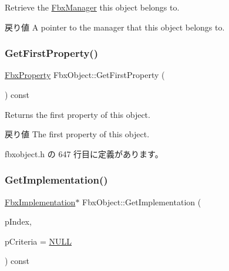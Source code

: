 Retrieve the \hyperlink{class_fbx_manager}{Fbx\+Manager} this object belongs to. \begin{DoxyReturn}{戻り値}
A pointer to the manager that this object belongs to. 
\end{DoxyReturn}
\mbox{\label{class_fbx_object_abc7d6efa0f0b7f0037818b8700465077}} 
\subsubsection{\texorpdfstring{Get\+First\+Property()}{GetFirstProperty()}}
{\footnotesize\ttfamily \hyperlink{class_fbx_property}{Fbx\+Property} Fbx\+Object\+::\+Get\+First\+Property (\begin{DoxyParamCaption}{ }\end{DoxyParamCaption}) const\hspace{0.3cm}{\ttfamily [inline]}}

Returns the first property of this object. \begin{DoxyReturn}{戻り値}
The first property of this object. 
\end{DoxyReturn}


 fbxobject.\+h の 647 行目に定義があります。

\mbox{\label{class_fbx_object_a396d7a8496c2eef786ce73bac59ab55a}} 
\subsubsection{\texorpdfstring{Get\+Implementation()}{GetImplementation()}}
{\footnotesize\ttfamily \hyperlink{class_fbx_implementation}{Fbx\+Implementation}$\ast$ Fbx\+Object\+::\+Get\+Implementation (\begin{DoxyParamCaption}\item[{int}]{p\+Index,  }\item[{const \hyperlink{class_fbx_implementation_filter}{Fbx\+Implementation\+Filter} $\ast$}]{p\+Criteria = {\ttfamily \hyperlink{fbxarch_8h_a070d2ce7b6bb7e5c05602aa8c308d0c4}{N\+U\+LL}} }\end{DoxyParamCaption}) const}

